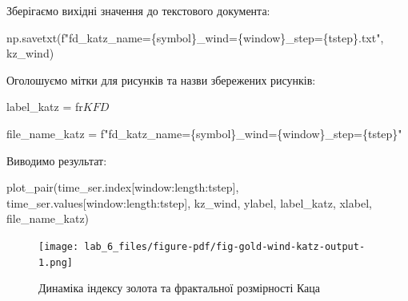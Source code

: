 \documentclass[
  letterpaper,
]{report}
\newenvironment{Shaded}{\begin{snugshade}}{\end{snugshade}}
\newcommand{\NormalTok}[1]{\textcolor[rgb]{0.00,0.23,0.31}{#1}}
\newcommand{\OperatorTok}[1]{\textcolor[rgb]{0.37,0.37,0.37}{#1}}
\newcommand{\SpecialCharTok}[1]{\textcolor[rgb]{0.37,0.37,0.37}{#1}}
\newcommand{\SpecialStringTok}[1]{\textcolor[rgb]{0.13,0.47,0.30}{#1}}
\newcommand{\VerbatimStringTok}[1]{\textcolor[rgb]{0.13,0.47,0.30}{#1}}
\begin{document}
Зберігаємо вихідні значення до текстового документа:

\begin{Shaded}
\begin{Highlighting}[]
\NormalTok{np.savetxt(}\SpecialStringTok{f"fd\_katz\_name=}\SpecialCharTok{\{}\NormalTok{symbol}\SpecialCharTok{\}}\SpecialStringTok{\_wind=}\SpecialCharTok{\{}\NormalTok{window}\SpecialCharTok{\}}\SpecialStringTok{\_step=}\SpecialCharTok{\{}\NormalTok{tstep}\SpecialCharTok{\}}\SpecialStringTok{.txt"}\NormalTok{, kz\_wind)}
\end{Highlighting}
\end{Shaded}

Оголошуємо мітки для рисунків та назви збережених рисунків:

\begin{Shaded}
\begin{Highlighting}[]
\NormalTok{label\_katz }\OperatorTok{=} \VerbatimStringTok{fr\textquotesingle{}$KFD$\textquotesingle{}}

\NormalTok{file\_name\_katz }\OperatorTok{=} \SpecialStringTok{f"fd\_katz\_name=}\SpecialCharTok{\{}\NormalTok{symbol}\SpecialCharTok{\}}\SpecialStringTok{\_wind=}\SpecialCharTok{\{}\NormalTok{window}\SpecialCharTok{\}}\SpecialStringTok{\_step=}\SpecialCharTok{\{}\NormalTok{tstep}\SpecialCharTok{\}}\SpecialStringTok{"}
\end{Highlighting}
\end{Shaded}

Виводимо результат:

\begin{Shaded}
\begin{Highlighting}[]
\NormalTok{plot\_pair(time\_ser.index[window:length:tstep],}
\NormalTok{          time\_ser.values[window:length:tstep],}
\NormalTok{          kz\_wind, }
\NormalTok{          ylabel, }
\NormalTok{          label\_katz,}
\NormalTok{          xlabel,}
\NormalTok{          file\_name\_katz)}
\end{Highlighting}
\end{Shaded}

\begin{figure}[H]

{\centering \texttt{[image: lab\_6\_files/figure-pdf/fig-gold-wind-katz-output-1.png]}

}

\caption{\label{fig-gold-wind-katz}Динаміка індексу золота та
фрактальної розмірності Каца}

\end{figure}
\end{document}
